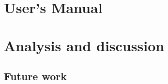 \documentclass[12pt, a4paper]{article}
\begin{document}

\section{User's Manual}





\section{Analysis and discussion}





\subsection{Future work}








\pagebreak


\end{document}
